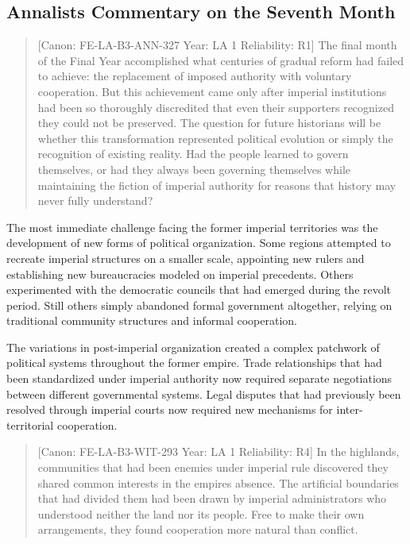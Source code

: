 \subsection{Annalist\textquotesingle s Commentary on the Seventh
Month}\label{annalists-commentary-on-the-seventh-month}

\begin{quote}
{[}Canon: FE-LA-B3-ANN-327 \textbar{} Year: LA 1 \textbar{} Reliability:
R1{]} The final month of the Final Year accomplished what centuries of
gradual reform had failed to achieve: the replacement of imposed
authority with voluntary cooperation. But this achievement came only
after imperial institutions had been so thoroughly discredited that even
their supporters recognized they could not be preserved. The question
for future historians will be whether this transformation represented
political evolution or simply the recognition of existing reality. Had
the people learned to govern themselves, or had they always been
governing themselves while maintaining the fiction of imperial authority
for reasons that history may never fully understand?
\end{quote}

The most immediate challenge facing the former imperial territories was
the development of new forms of political organization. Some regions
attempted to recreate imperial structures on a smaller scale, appointing
new rulers and establishing new bureaucracies modeled on imperial
precedents. Others experimented with the democratic councils that had
emerged during the revolt period. Still others simply abandoned formal
government altogether, relying on traditional community structures and
informal cooperation.

The variations in post-imperial organization created a complex patchwork
of political systems throughout the former empire. Trade relationships
that had been standardized under imperial authority now required
separate negotiations between different governmental systems. Legal
disputes that had previously been resolved through imperial courts now
required new mechanisms for inter-territorial cooperation.

\begin{quote}
{[}Canon: FE-LA-B3-WIT-293 \textbar{} Year: LA 1 \textbar{} Reliability:
R4{]} In the highlands, communities that had been enemies under imperial
rule discovered they shared common interests in the
empire\textquotesingle s absence. The artificial boundaries that had
divided them had been drawn by imperial administrators who understood
neither the land nor its people. Free to make their own arrangements,
they found cooperation more natural than conflict.
\end{quote}

